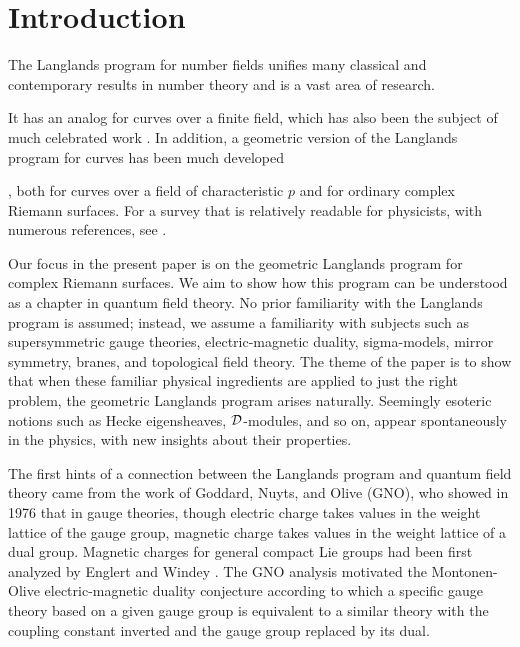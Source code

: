 
\section{Introduction}
\label{sec:intro}

 The Langlands program for number fields \cite{ref1} unifies many classical
and contemporary results in number theory and is a vast area of
research. 

It has an analog for curves over a finite field, which has also
been the subject of much celebrated work \cite{ref2,ref3}. In addition, a geometric version of the Langlands
program for curves has been much developed 

 
\cite{ref4,ref5,ref6,ref7,ref8}, both for curves over a field of
characteristic $p$ and for ordinary complex Riemann surfaces. For
a survey that is relatively readable for physicists, with numerous
references, see \cite{ref9}.

Our focus in the present paper is on the geometric Langlands
program for complex Riemann surfaces.  We aim to show how this
program can be understood as a chapter in quantum field theory. No
prior familiarity with the Langlands program is assumed; instead,
we assume a familiarity with subjects such as supersymmetric gauge
theories, electric-magnetic duality, sigma-models, mirror
symmetry, branes, and topological field theory. The theme of the
paper is to show that when these familiar physical ingredients are
applied to just the right problem, the geometric Langlands program
arises naturally. Seemingly esoteric notions such as Hecke
eigensheaves, ${\cal D}$-modules, and so on, appear spontaneously
in the physics, with new insights about their properties.

The first hints of a connection between the Langlands program and
quantum field theory came from the work of Goddard, Nuyts, and
Olive (GNO), who showed in 1976 \cite{ref10} that in gauge theories, though electric
charge takes values in the weight lattice of the gauge group,
magnetic charge takes values in the weight lattice of a dual
group. Magnetic charges for general compact Lie groups had been
first analyzed by Englert and Windey \cite{ref11}. The
GNO analysis motivated the Montonen-Olive electric-magnetic
duality conjecture \cite{ref12} according to which a specific gauge theory based
on a given gauge group is equivalent to a similar theory with the
coupling constant inverted and the gauge group replaced by its
dual.

